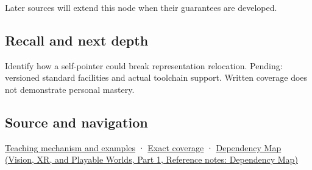 \hypertarget{appendix-adfd6397af8d-used-by}{}

Later sources will extend this node when their guarantees are developed.

\subsection{Recall and next depth}\label{appendix-adfd6397af8d-recall-and-next-depth}

\hypertarget{appendix-adfd6397af8d-recall-and-next-depth}{}

Identify how a self-pointer could break representation relocation. Pending: versioned standard facilities and actual toolchain support. Written coverage does not demonstrate personal mastery.

\subsection{Source and navigation}\label{appendix-adfd6397af8d-source-and-navigation}

\hypertarget{appendix-adfd6397af8d-source-and-navigation}{}

\hyperref[01-foundations-i-ch003-from-three-repairs-to-five-decisions-to-zero-boilerplate]{Teaching mechanism and examples} · \hyperref[appendix-fd090d982a15-m009---parts-127-147]{Exact coverage} · \href{../07-Vision-XR-and-Playable-Worlds-P01/main.pdf\#nameddest=appendix-4ad47bdd269a}{Dependency Map (Vision, XR, and Playable Worlds, Part 1, Reference notes: Dependency Map)}
